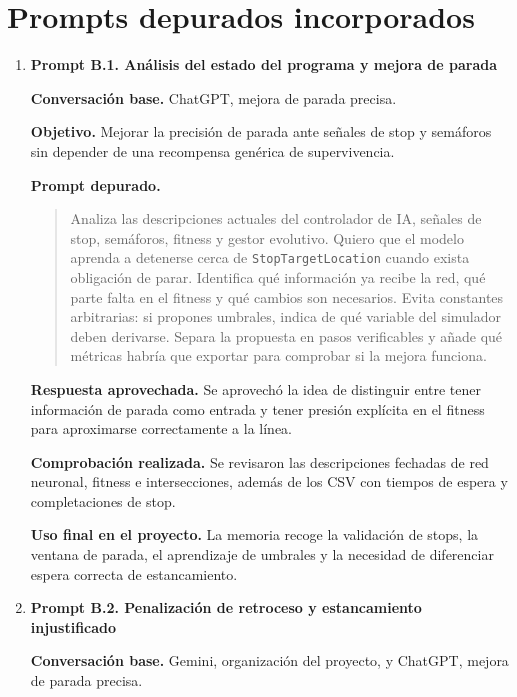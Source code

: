 \section{Prompts depurados incorporados}

\newcommand{\promptDepurado}{\Needspace{7\baselineskip}\textbf{Prompt depurado.}}

{\small
\begin{enumerate}[leftmargin=*,itemsep=0.2\baselineskip,topsep=2pt,parsep=0pt,partopsep=0pt]
  \item \textbf{Prompt B.1. Análisis del estado del programa y mejora de parada}

  \textbf{Conversación base.} ChatGPT, mejora de parada precisa.

  \textbf{Objetivo.} Mejorar la precisión de parada ante señales de stop y semáforos sin depender de una recompensa genérica de supervivencia.

  \promptDepurado
  \begin{quote}
  \small
  Analiza las descripciones actuales del controlador de IA, señales de stop, semáforos, fitness y gestor evolutivo. Quiero que el modelo aprenda a detenerse cerca de \texttt{StopTargetLocation} cuando exista obligación de parar. Identifica qué información ya recibe la red, qué parte falta en el fitness y qué cambios son necesarios. Evita constantes arbitrarias: si propones umbrales, indica de qué variable del simulador deben derivarse. Separa la propuesta en pasos verificables y añade qué métricas habría que exportar para comprobar si la mejora funciona.
  \end{quote}

  \textbf{Respuesta aprovechada.} Se aprovechó la idea de distinguir entre tener información de parada como entrada y tener presión explícita en el fitness para aproximarse correctamente a la línea.

  \textbf{Comprobación realizada.} Se revisaron las descripciones fechadas de red neuronal, fitness e intersecciones, además de los CSV con tiempos de espera y completaciones de stop.

  \textbf{Uso final en el proyecto.} La memoria recoge la validación de stops, la ventana de parada, el aprendizaje de umbrales y la necesidad de diferenciar espera correcta de estancamiento.

  \item \textbf{Prompt B.2. Penalización de retroceso y estancamiento injustificado}

  \textbf{Conversación base.} Gemini, organización del proyecto, y ChatGPT, mejora de parada precisa.


\end{enumerate}}
